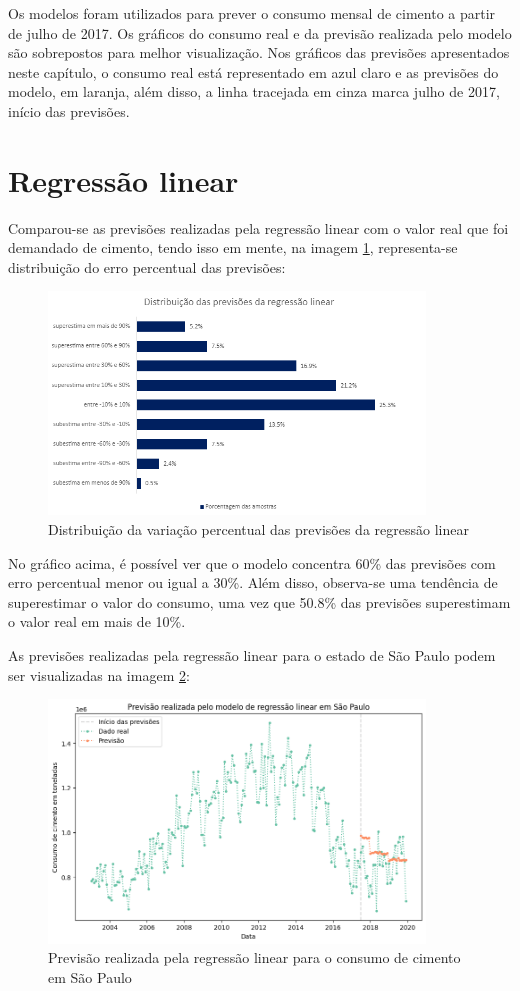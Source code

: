 Os modelos foram utilizados para prever o consumo mensal de 
cimento a partir de julho de 2017. Os gráficos do consumo real 
e da previsão realizada pelo modelo são sobrepostos para melhor
visualização. Nos gráficos das previsões apresentados neste 
capítulo, o consumo real está representado em azul claro e 
as previsões do modelo, em laranja, além disso, a linha 
tracejada em cinza marca julho de 2017, início das previsões.

\section{Regressão linear}

Comparou-se as previsões realizadas pela regressão linear com o valor real 
que foi demandado de cimento, tendo isso em mente, na imagem \ref{img:erro-perc-rg}, representa-se 
distribuição do erro percentual das previsões:

\begin{figure}[H]
    \centering
    \includegraphics[width=10cm]{../figuras/graficos/reg_lin/erro-perc-rg.png}
    \caption{Distribuição da variação percentual das previsões da regressão linear}
    \label{img:erro-perc-rg}
\end{figure}

No gráfico acima, é possível ver que o modelo concentra 60\% das previsões 
com erro percentual menor ou igual a 30\%. Além disso, observa-se uma 
tendência de superestimar o valor do consumo, uma vez que 50.8\% das previsões
superestimam o valor real em mais de 10\%. 

As previsões realizadas pela regressão linear para o estado 
de São Paulo podem ser visualizadas na imagem \ref{prev-sp-rg}:

\begin{figure}[H]
    \centering
    \includegraphics[width=10cm]{../figuras/graficos/reg_lin/prev_sp.png}
    \caption{Previsão realizada pela regressão linear para o 
    consumo de cimento em São Paulo}
    \label{prev-sp-rg}
\end{figure}

